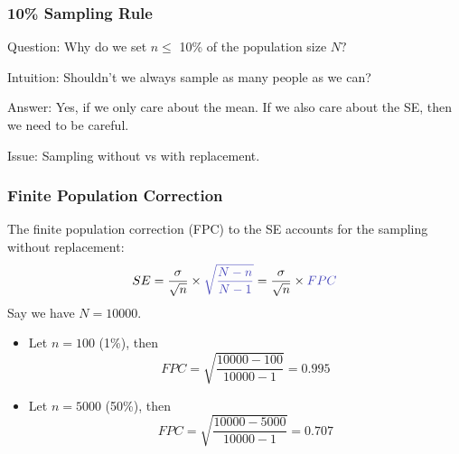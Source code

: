 \documentclass[handout]{beamer}
\newcommand{\blue}[1]{\textcolor{blue2}{#1}}
\begin{document}
\begin{frame}[fragile]
\frametitle{10\% Sampling Rule}

\blue{Question}: Why do we set $n \leq$ 10\% of the population size $N?$

\pause\vspace{0.5cm}

\blue{Intuition}: Shouldn't we always sample as many people as we can?

\pause\vspace{0.5cm}

\blue{Answer}: Yes, if we only care about the mean.  If we also care about the SE, then we need to be careful.  

\pause\vspace{0.5cm}

\blue{Issue}:  Sampling without vs with replacement.

\end{frame}


\begin{frame}[fragile]
\frametitle{Finite Population Correction}

%
%
The \blue{finite population correction (FPC)} to the SE accounts for the \blue{sampling without replacement}:
\[
SE = \frac{\sigma}{\sqrt{n}} \times \blue{\sqrt{\frac{N-n}{N-1}}} =
\frac{\sigma}{\sqrt{n}} \times \blue{FPC}
\]
Say we have $N=10000$.  
\begin{itemize}
\pause\item Let $n=100$ (1\%), then
\[
FPC=\sqrt{\frac{10000-100}{10000-1}} = 0.995
\]
\pause\item Let $n=5000$ (50\%), then
\[
FPC=\sqrt{\frac{10000-5000}{10000-1}} = 0.707
\]
\end{itemize}

\end{frame}
\end{document}
